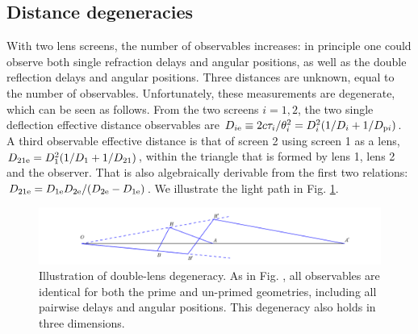 \documentclass[useAMS,usenatbib]{mn2e}
\begin{document}
\subsection{Distance degeneracies}
\label{sec:degeneracy}
With two lens screens, the number of observables increases: in
principle one could observe both single refraction delays and angular
positions, as well as the double reflection delays and angular
positions.  Three distances are unknown, equal to the number of
observables.  Unfortunately, these measurements are degenerate, which
can be seen as follows.  From the two screens $i=1,2$, the two single
deflection effective distance observables are
$D_{i{\rm e}} \equiv 2c\tau_i/\theta_i^2=D_i^2(1/D_i+1/D_{{\rm p}i})$.  A third
observable effective distance is that of screen 2 using screen 1 as a
lens, $D_{21{\rm e}}=D_1^2(1/D_1+1/D_{21})$, within the triangle that is formed by lens 1, lens 2 and the observer.  That is also algebraically
derivable from the first two relations:
$D_{{21}{\rm e}}=D_{1{\rm e}}D_{2{\rm e}}/(D_{2{\rm e}}-D_{1{\rm e}})$.  
We illustrate the light path in Fig. \ref{fig:double_degeneracy}.
\begin{figure}
\centering
\hspace*{-1in}\includegraphics[width=9in]{double_degeneracy.pdf}
\caption{Illustration of double-lens degeneracy.  As in
  Fig. \protect{\ref{fig:Singledegeneracy}}, all observables are identical
  for both the prime and un-primed geometries, including all pairwise
  delays and angular positions.  This degeneracy also holds in three dimensions.}
\label{fig:double_degeneracy}
\end{figure}
\end{document}
